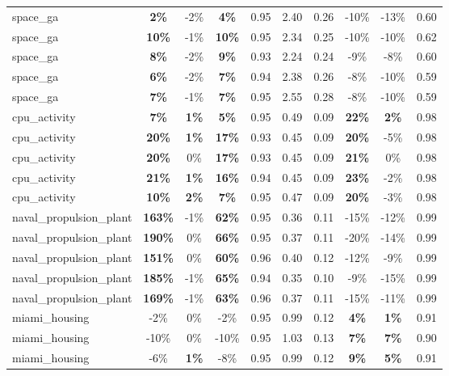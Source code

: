 \begin{table}[!htbp]
\begin{small}
\begin{sc}
{\begin{tabular}{lccccccccc}
space\_ga & \textbf{2\%} & -2\% & \textbf{4\%} & 0.95 & 2.40 & 0.26 & -10\% & -13\% & 0.60 \\
space\_ga & \textbf{10\%} & -1\% & \textbf{10\%} & 0.95 & 2.34 & 0.25 & -10\% & -10\% & 0.62 \\
space\_ga & \textbf{8\%} & -2\% & \textbf{9\%} & 0.93 & 2.24 & 0.24 & -9\% & -8\% & 0.60 \\
space\_ga & \textbf{6\%} & -2\% & \textbf{7\%} & 0.94 & 2.38 & 0.26 & -8\% & -10\% & 0.59 \\
space\_ga & \textbf{7\%} & -1\% & \textbf{7\%} & 0.95 & 2.55 & 0.28 & -8\% & -10\% & 0.59 \\
cpu\_activity & \textbf{7\%} & \textbf{1\%} & \textbf{5\%} & 0.95 & 0.49 & 0.09 & \textbf{22\%} & \textbf{2\%} & 0.98 \\
cpu\_activity & \textbf{20\%} & \textbf{1\%} & \textbf{17\%} & 0.93 & 0.45 & 0.09 & \textbf{20\%} & -5\% & 0.98 \\
cpu\_activity & \textbf{20\%} & 0\% & \textbf{17\%} & 0.93 & 0.45 & 0.09 & \textbf{21\%} & 0\% & 0.98 \\
cpu\_activity & \textbf{21\%} & \textbf{1\%} & \textbf{16\%} & 0.94 & 0.45 & 0.09 & \textbf{23\%} & -2\% & 0.98 \\
cpu\_activity & \textbf{10\%} & \textbf{2\%} & \textbf{7\%} & 0.95 & 0.47 & 0.09 & \textbf{20\%} & -3\% & 0.98 \\
naval\_propulsion\_plant & \textbf{163\%} & -1\% & \textbf{62\%} & 0.95 & 0.36 & 0.11 & -15\% & -12\% & 0.99 \\
naval\_propulsion\_plant & \textbf{190\%} & 0\% & \textbf{66\%} & 0.95 & 0.37 & 0.11 & -20\% & -14\% & 0.99 \\
naval\_propulsion\_plant & \textbf{151\%} & 0\% & \textbf{60\%} & 0.96 & 0.40 & 0.12 & -12\% & -9\% & 0.99 \\
naval\_propulsion\_plant & \textbf{185\%} & -1\% & \textbf{65\%} & 0.94 & 0.35 & 0.10 & -9\% & -15\% & 0.99 \\
naval\_propulsion\_plant & \textbf{169\%} & -1\% & \textbf{63\%} & 0.96 & 0.37 & 0.11 & -15\% & -11\% & 0.99 \\
miami\_housing & -2\% & 0\% & -2\% & 0.95 & 0.99 & 0.12 & \textbf{4\%} & \textbf{1\%} & 0.91 \\
miami\_housing & -10\% & 0\% & -10\% & 0.95 & 1.03 & 0.13 & \textbf{7\%} & \textbf{7\%} & 0.90 \\
miami\_housing & -6\% & \textbf{1\%} & -8\% & 0.95 & 0.99 & 0.12 & \textbf{9\%} & \textbf{5\%} & 0.91 \\

\end{tabular}}
\end{sc}
\end{small}
\end{table}
